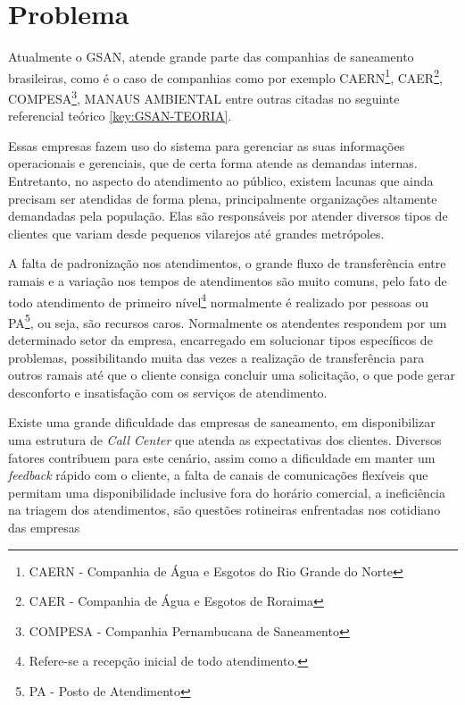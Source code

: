 \section*{Problema}

Atualmente o GSAN, atende grande parte das companhias de saneamento brasileiras, como é o caso de companhias como por exemplo CAERN\footnote{CAERN - Companhia de Água e Esgotos do Rio Grande do Norte}, CAER\footnote{CAER - Companhia de Água e Esgotos de Roraima}, COMPESA\footnote{COMPESA - Companhia Pernambucana de Saneamento}, MANAUS AMBIENTAL entre outras citadas no seguinte referencial teórico \ref{key:GSAN-TEORIA}.

Essas empresas fazem uso do sistema para gerenciar as suas informações operacionais e gerenciais, que de certa forma atende as demandas internas. Entretanto, no aspecto do atendimento ao público, existem lacunas que ainda precisam ser atendidas de forma plena, principalmente organizações altamente demandadas pela população. Elas são responsáveis por atender diversos tipos de clientes que variam desde pequenos vilarejos até grandes metrópoles.

A falta de padronização nos atendimentos, o grande fluxo de transferência entre ramais e a variação nos tempos de atendimentos são muito comuns, pelo fato de todo atendimento de primeiro nível\footnote{Refere-se a recepção inicial de todo atendimento.} normalmente é realizado por pessoas ou PA\footnote{PA - Posto de Atendimento}, ou seja, são recursos caros. Normalmente os atendentes respondem por um determinado setor da empresa, encarregado em solucionar tipos específicos de problemas, possibilitando muita das vezes a realização de transferência para outros ramais até que o cliente consiga concluir uma solicitação, o que pode gerar desconforto e insatisfação com os serviços de atendimento.
	
Existe uma grande dificuldade das empresas de saneamento, em disponibilizar uma estrutura de \textit{Call Center} que atenda as expectativas dos clientes.
Diversos fatores contribuem para este cenário, assim como a dificuldade em manter um \textit{feedback} rápido com o cliente, a falta de canais de comunicações flexíveis que permitam uma disponibilidade inclusive fora do horário comercial, a ineficiência na triagem dos atendimentos, são questões rotineiras enfrentadas nos cotidiano das empresas

